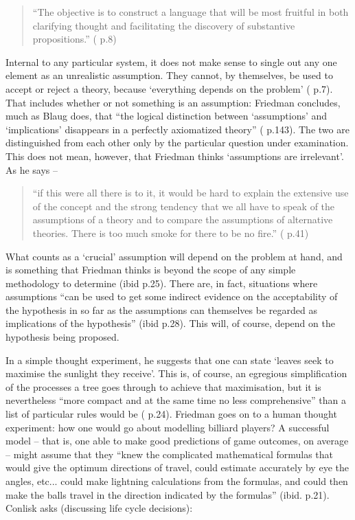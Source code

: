 \begin{quote}
``The objective is to construct a language that will be most fruitful in both clarifying thought and facilitating the discovery of substantive propositions.'' (\citealt{friedman_price_1962} p.8)
\end{quote}

Internal to any particular system, it does not make sense to single out any one element as an unrealistic assumption. They cannot, by themselves, be used to accept or reject a theory, because `everything depends on the problem' (\citealt{friedman_essays_1953} p.7). That includes whether or not something is an assumption: Friedman concludes, much as Blaug does, that ``the logical distinction between `assumptions' and `implications' disappears in a perfectly axiomatized theory'' (\citealt{blaug_methodology_1992} p.143). The two are distinguished from each other only by the particular question under examination. This does not mean, however, that Friedman thinks `assumptions are irrelevant'. As he says –

\begin{quote}
``if this were all there is to it, it would be hard to explain the extensive use of the concept and the strong tendency that we all have to speak of the assumptions of a theory and to compare the assumptions of alternative theories. There is too much smoke for there to be no fire.'' (\citealt{friedman_essays_1953} p.41)
\end{quote}

What counts as a `crucial' assumption will depend on the problem at hand, and is something that Friedman thinks is beyond the scope of any simple methodology to determine (ibid p.25). There are, in fact, situations where assumptions ``can be used to get some indirect evidence on the acceptability of the hypothesis in so far as the assumptions can themselves be regarded as implications of the hypothesis'' (ibid p.28). This will, of course, depend on the hypothesis being proposed. 

In a simple thought experiment, he suggests that one can state `leaves seek to maximise the sunlight they receive'. This is, of course, an egregious simplification of the processes a tree goes through to achieve that maximisation, but it is nevertheless ``more compact and at the same time no less comprehensive'' than a list of particular rules would be (\citealt{friedman_essays_1953} p.24). Friedman goes on to a human thought experiment: how one would go about modelling billiard players? A successful model – that is, one able to make good predictions of game outcomes, on average – might assume that they ``knew the complicated mathematical formulas that would give the optimum directions of travel, could estimate accurately by eye the angles, etc... could make lightning calculations from the formulas, and could then make the balls travel in the direction indicated by the formulas'' (ibid. p.21). Conlisk asks (discussing life cycle decisions):

